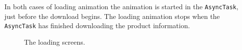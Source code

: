 In both cases of loading animation the animation is started in the \texttt{AsyncTask}, just before the download begins. The loading animation stops when the \texttt{AsyncTask} has finished downloading the product information.


	\begin{figure}[ht!]
		\centering
   		 \qquad
   		 \qquad
		\caption{The loading screens.}
		\label{downloadLoading}
	\end{figure}

